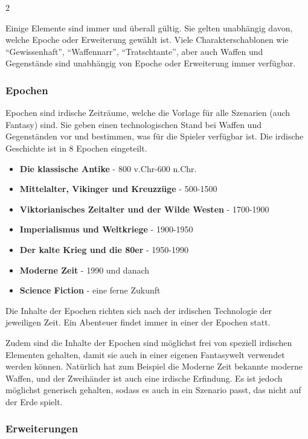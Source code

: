 \begin{multicols}{2}
{Einige Elemente sind immer und überall gültig. Sie gelten unabhängig davon, welche Epoche oder Erweiterung gewählt ist. Viele Charakterschablonen wie ``Gewissenhaft'', ``Waffennarr'', ``Tratschtante'', aber auch Waffen und Gegenstände sind unabhängig von Epoche oder Erweiterung immer verfügbar.

\subsubsection{Epochen}

Epochen sind irdische Zeiträume, welche die Vorlage für alle Szenarien (auch Fantasy) sind. Sie geben einen technologischen Stand bei Waffen und Gegenständen vor und bestimmen, was für die Spieler verfügbar ist. Die irdische Geschichte ist in 8 Epochen eingeteilt.

\begin{itemize}
    \item \textbf{Die klassische Antike} - 800 v.Chr-600 n.Chr.
    \item \textbf{Mittelalter, Vikinger und Kreuzzüge} - 500-1500
    \item \textbf{Viktorianisches Zeitalter und der Wilde Westen} - 1700-1900
    \item \textbf{Imperialismus und Weltkriege} - 1900-1950
    \item \textbf{Der kalte Krieg und die 80er} - 1950-1990
    \item \textbf{Moderne Zeit} - 1990 und danach
    \item \textbf{Science Fiction} - eine ferne Zukunft
\end{itemize}

Die Inhalte der Epochen richten sich nach der irdischen Technologie der jeweiligen Zeit. Ein Abenteuer findet immer in einer der Epochen statt.

Zudem sind die Inhalte der Epochen sind möglichst frei von speziell irdischen Elementen gehalten, damit sie auch in einer eigenen Fantasywelt verwendet werden können. Natürlich hat zum Beispiel die Moderne Zeit bekannte moderne Waffen, und der Zweihänder ist auch eine irdische Erfindung. Es ist jedoch möglichst generisch gehalten, sodass es auch in ein Szenario passt, das nicht auf der Erde spielt.

\subsubsection{Erweiterungen}

}
\end{multicols}
